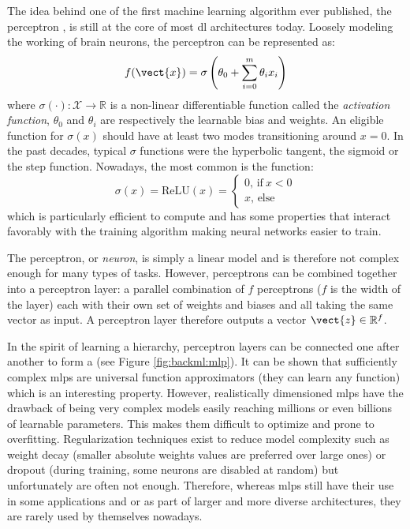 The idea behind one of the first machine learning algorithm ever published, the
perceptron \cite{rosenblatt1958perceptron}, is still at the core of most
\acrlong{dl} architectures today. Loosely modeling the working of brain neurons,
the perceptron can be represented as:
\begin{equation}
\label{eqn:backml:perceptron}
f(\vect{x}) = \sigma\left(\theta_0 + \sum_{i=0}^m \theta_i x_i\right)
\end{equation}
where $\sigma(\cdot): \mathcal{X} \rightarrow \mathbb{R}$ is a non-linear
differentiable function called the \textit{activation function}, $\theta_0$ and
$\theta_i$ are respectively the learnable bias and weights. An eligible function
for $\sigma(x)$ should have at least two modes transitioning around $x=0$. In the
past decades, typical $\sigma$ functions were the hyperbolic tangent, the sigmoid
or the step function. Nowadays, the most common is the  function:
\begin{equation}
  \label{eqn:backml:relu}
  \sigma(x) = \text{ReLU}(x) = \begin{cases}
  0\text{, if}~ x < 0\\
  x\text{, else}
  \end{cases}
\end{equation}
which is particularly efficient to compute
and has some properties that interact favorably with the training algorithm making
neural networks easier to train.

The perceptron, or \textit{neuron}, is simply a linear model and is therefore not
complex enough for many types of tasks. However, perceptrons can be combined together
into a perceptron layer: a parallel combination of $f$ perceptrons ($f$ is the
width of the layer) each with their own set of weights and biases and all taking
the same vector as input. A perceptron layer therefore outputs a vector
$\vect{z} \in \mathbb{R}^f$.

In the spirit of learning a hierarchy, perceptron layers can be connected one
after another to form a  (see Figure \ref{fig:backml:mlp}). It
can be shown that sufficiently complex \acrshort{mlp}s are universal function
approximators (\ie they can learn any function) \cite{hornik1989multilayer}
which is an interesting property. However, realistically dimensioned \acrshort{mlp}s
have the drawback of being very complex models easily reaching millions or even
billions of learnable parameters. This makes them difficult to optimize and prone
to overfitting. Regularization techniques exist to reduce model complexity such
as weight decay (\ie smaller absolute weights values are preferred over large
ones) or dropout \cite{srivastava2014dropout} (\ie during training, some
neurons are disabled at random) but unfortunately are often not enough. Therefore,
whereas \acrshort{mlp}s still have their use in some applications and or as part
of larger and more diverse architectures, they are rarely used by themselves
nowadays.

